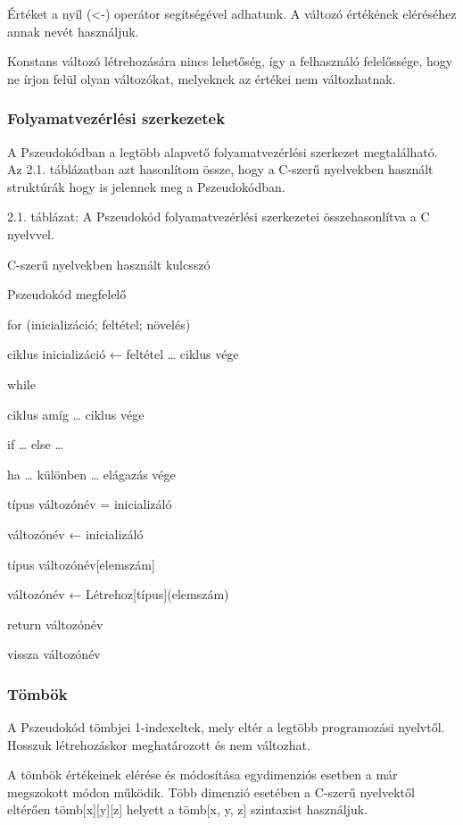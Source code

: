 Értéket a nyíl (<-) operátor segítségével adhatunk. A változó értékének eléréséhez annak nevét használjuk.

Konstans változó létrehozására nincs lehetőség, így a felhasználó felelőssége, hogy ne írjon felül olyan változókat, melyeknek az értékei nem változhatnak.

\subsubsection{Folyamatvezérlési szerkezetek}

A Pszeudokódban a legtöbb alapvető folyamatvezérlési szerkezet megtalálható. Az 2.1. táblázatban azt hasonlítom össze, hogy a C-szerű nyelvekben használt struktúrák hogy is jelennek meg a Pszeudokódban.

2.1. táblázat: A Pszeudokód folyamatvezérlési szerkezetei összehasonlítva a C nyelvvel.

C-szerű nyelvekben használt kulcsszó

Pszeudokód megfelelő

for ({inicializáció}; {feltétel}; {növelés})

ciklus {inicializáció} ← {feltétel} … ciklus vége

while

ciklus amíg … ciklus vége

if … else … 

ha … különben … elágazás vége

{típus} {változónév} = {inicializáló}

{változónév} ← {inicializáló}

{típus} {változónév}[{elemszám}]

{változónév} ← Létrehoz[{típus}]({elemszám})

return {változónév}

vissza {változónév}

\subsubsection{Tömbök}

A Pszeudokód tömbjei 1-indexeltek, mely eltér a legtöbb programozási nyelvtől. Hosszuk létrehozáskor meghatározott és nem változhat.

A tömbök értékeinek elérése és módosítása egydimenziós esetben a már megszokott módon működik. Több dimenzió esetében a C-szerű nyelvektől eltérően tömb[x][y][z] helyett a tömb[x, y, z] szintaxist használjuk.

